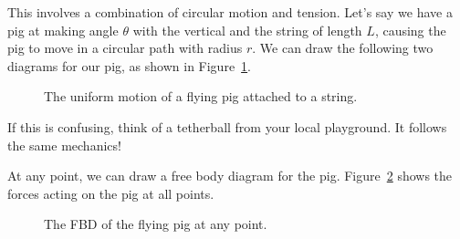 This involves a combination of circular motion and tension. Let's say we have a pig at making angle $\theta$ with the vertical and the string of length $L$, causing the pig to move in a circular path with radius $r$. We can draw the following two diagrams for our pig, as shown in Figure~\ref{fig:flyingpig1}.

\begin{figure}[H]
  \centering
  \begin{center}
  \end{center}
  \caption{The uniform motion of a flying pig attached to a string.}
  \label{fig:flyingpig1}
\end{figure}

If this is confusing, think of a tetherball from your local playground. It follows the same mechanics!

At any point, we can draw a free body diagram for the pig. Figure~\ref{fig:flyingpig2} shows the forces acting on the pig at all points.
\begin{figure}[H]
  \centering
  \caption{The FBD of the flying pig at any point.}
  \label{fig:flyingpig2}
\end{figure}


